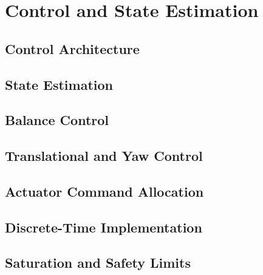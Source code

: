 \chapter{Control and State Estimation}

\section{Control Architecture}

\section{State Estimation}

\section{Balance Control}

\section{Translational and Yaw Control}

\section{Actuator Command Allocation}

\section{Discrete-Time Implementation}

\section{Saturation and Safety Limits}
